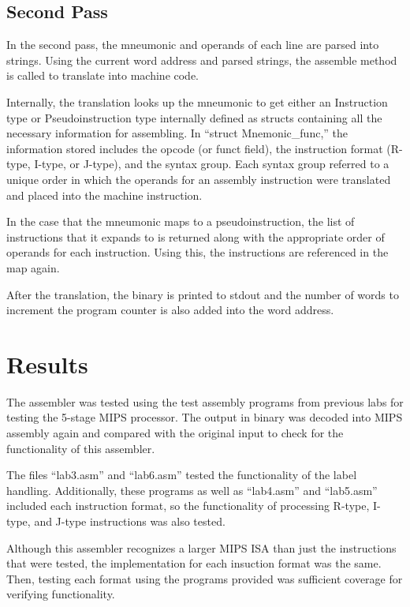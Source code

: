 \documentclass[titlepage]{article}
\begin{document}
\subsection*{Second Pass}
In the second pass, the mneumonic and operands of each line are parsed into 
strings. Using the current word address and parsed strings, the assemble method 
is called to translate into machine code. 

Internally, the translation looks up the mneumonic to get either an Instruction
type or Pseudoinstruction type internally defined as structs containing all the
necessary information for assembling. In ``struct Mnemonic\_func,'' the 
information stored includes the opcode (or funct field), the instruction format 
(R-type, I-type, or J-type), and the syntax group. Each syntax group referred to
a unique order in which the operands for an assembly instruction were translated
and placed into the machine instruction. 

In the case that the mneumonic maps to a pseudoinstruction, the list of 
instructions that it expands to is returned along with the appropriate order of
operands for each instruction. Using this, the instructions are referenced in 
the map again.

After the translation, the binary is printed to stdout and the number of words 
to increment the program counter is also added into the word address. 

\section*{Results}

The assembler was tested using the test assembly programs from previous labs for
testing the 5-stage MIPS processor. The output in binary was decoded into MIPS 
assembly again and compared with the original input to check for the 
functionality of this assembler.

The files ``lab3.asm'' and ``lab6.asm'' tested the functionality of the label 
handling. Additionally, these programs as well as ``lab4.asm'' and ``lab5.asm'' 
included each instruction format, so the functionality of processing R-type, 
I-type, and J-type instructions was also tested. 

Although this assembler recognizes a larger MIPS ISA than just the instructions
that were tested, the implementation for each insuction format was the same. 
Then, testing each format using the programs provided was sufficient coverage 
for verifying functionality.
\end{document}
